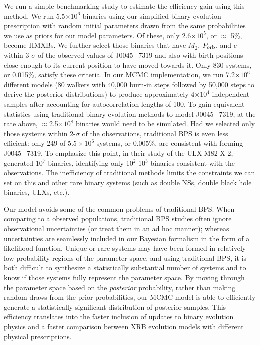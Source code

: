 \documentclass[usenatbib]{mnras}
\begin{document}
We run a simple benchmarking study to estimate the efficiency gain using this method. We run 5.5$\times 10^6$ binaries using our simplified binary evolution prescription with random initial parameters drawn from the same probabilities we use as priors for our model parameters. Of these, only 2.6$\times 10^5$, or $\approx$ 5\%, become HMXBs. We further select those binaries that have $M_2$, $P_{\rm orb}$, and $e$ within 3-$\sigma$ of the observed values of J0045$-$7319 and also with birth positions close enough to its current position to have moved towards it. Only 830 systems, or 0.015\%, satisfy these criteria. In our MCMC implementation, we run 7.2$\times 10^6$ different models (80 walkers with 40,000 burn-in steps followed by 50,000 steps to derive the posterior distributions) to produce approximately 4$\times 10^4$ independent samples after accounting for autocorrelation lengths of 100. To gain equivalent statistics using traditional binary evolution methods to model J0045$-$7319, at the rate above, $\approx$2.5$\times 10^8$ binaries would need to be simulated. Had we selected only those systems within 2-$\sigma$ of the observations, traditional BPS is even less efficient: only 249 of $5.5\times10^6$ systems, or 0.005\%, are consistent with forming J0045$-$7319. To emphasize this point, in their study of the ULX M82 X-2, \citet{fragos15} generated 10$^7$ binaries, identifying only 10$^2$-10$^3$ binaries consistent with the observations. The inefficiency of traditional methods limits the constraints we can set on this and other rare binary systems (such as double NSs, double black hole binaries, ULXs, etc.).



Our model avoids some of the common problems of traditional BPS. When comparing to a observed populations, traditional BPS studies often ignore observational uncertainties (or treat them in an ad hoc manner); whereas uncertainties are seamlessly included in our Bayesian formalism in the form of a likelihood function. Unique or rare systems may have been formed in relatively low probability regions of the parameter space, and using traditional BPS, it is both difficult to synthesize a statistically substantial number of systems and to know if those systems fully represent the parameter space. By moving through the parameter space based on the {\it posterior} probability, rather than making random draws from the prior probabilities, our MCMC model is able to efficiently generate a statistically significant distribution of posterior samples. This efficiency translates into the faster inclusion of updates to binary evolution physics and a faster comparison between XRB evolution models with different physical prescriptions. 
\end{document}
